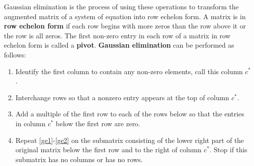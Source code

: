 \documentclass[12pt,reqno]{amsart}
\theoremstyle{definition}
\begin{document}
Gaussian elimination is the process of using these operations to
transform the augmented matrix of a system of equation into row
echelon form.  A matrix is in \textbf{row echelon form} if each row
begins with more zeros than the row above it or the row is all
zeros. The first non-zero entry in each row of a matrix in row echelon
form is called a \textbf{pivot}.  \textbf{Gaussian elimination} can be
performed as follows:
\renewcommand{\theenumi}{GE\arabic{enumi}}
\begin{enumerate}
\item\label{ge1} Identify the first column to contain any non-zero
  elements, call this column $c^*$.
\item\label{ge2} Interchange rows so that a nonzero entry appears at
  the top of column $c^*$. 
\item\label{ge3} Add a multiple of the first row to each of the rows
  below so that the entries in column $c^*$ below the first row are
  zero.
\item\label{ge4} Repeat \ref{ge1}-\ref{ge2} on the submatrix
  consisting of the lower right part of the original matrix below the
  first row and to the right of column $c^*$. Stop if this submatrix
  has no columns or has no rows.
\end{enumerate}
\end{document}
